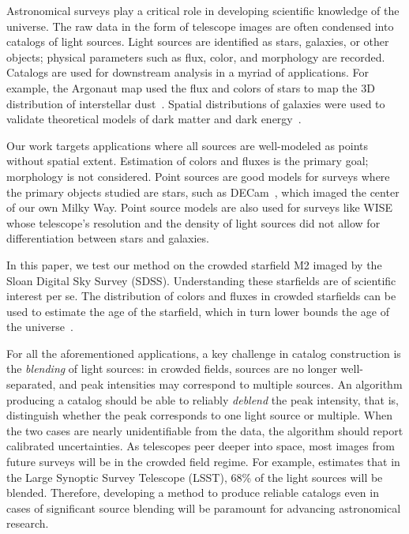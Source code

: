 Astronomical surveys play a critical role in developing scientific knowledge of the universe.
The raw data in the form of telescope images
are often condensed into catalogs of light sources. 
Light sources are identified as stars, galaxies, or other objects; physical parameters such as flux, color, and morphology are recorded. Catalogs are used for downstream analysis in a myriad of applications. For example, the Argonaut map used the flux and colors of stars to map the 3D distribution of interstellar dust~\cite{Green_2019_argonaut}. Spatial distributions of galaxies were used to 
validate theoretical models of dark matter and dark energy~\cite{Eisenstein_2005_darkmatter}. 

Our work targets applications where all sources are well-modeled as points without spatial extent. Estimation of colors and fluxes is the primary goal; morphology is not considered. 
Point sources are good models for surveys where the primary objects studied are stars, such as DECam~\cite{Schlafly_2018_DECam}, which imaged the center of our own Milky Way. Point source models are also used for surveys like WISE~\cite{Wright_2010_WISESurvey} whose telescope's resolution and the density of light sources did not allow for differentiation between stars and galaxies. 

In this paper, we test our method on the crowded starfield M2 imaged by the Sloan Digital Sky Survey (SDSS). 
Understanding these starfields are of scientific interest per se. The distribution 
of colors and fluxes in crowded starfields 
can be used to estimate the age 
of the starfield, which in turn lower bounds the 
age of the universe~\cite{Isochrome_fitting}. 

For all the aforementioned applications, a key challenge
in catalog construction is the {\itshape blending} of light sources: in crowded fields, sources are no longer well-separated, and peak intensities may correspond to multiple sources. An algorithm producing a catalog should be able to reliably {\itshape deblend} the peak intensity, that is, distinguish whether the peak corresponds to one light source or 
multiple. When the two cases are nearly unidentifiable from the data, the algorithm should 
report calibrated uncertainties. As telescopes peer deeper into space, most images from future surveys will be in the crowded field regime. 
For example, \cite{Bosch_2017_LSST} estimates that in the Large Synoptic Survey Telescope (LSST), 68\% of the light sources will be blended. Therefore, developing a method to produce reliable catalogs even in cases of significant source blending will be paramount for advancing astronomical research. 

